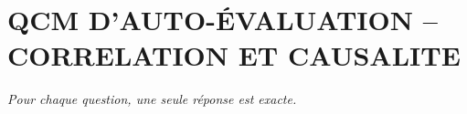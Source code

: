 
\section*{\textcolor{chapcolor}{\MakeUppercase{QCM d'auto-évaluation -- Correlation et causalite}}}

\begin{center}
\textit{Pour chaque question, une seule réponse est exacte.}
\end{center}

